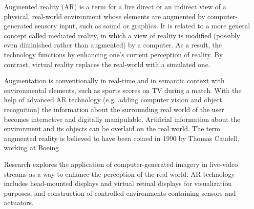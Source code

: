 Augmented reality (AR) \cite{wikiAR} is a term for a live direct or an indirect view of a physical, real-world environment whose elements are augmented by computer-generated sensory input, such as sound or graphics. It is related to a more general concept called mediated reality, in which a view of reality is modified (possibly even diminished rather than augmented) by a computer. As a result, the technology functions by enhancing one’s current perception of reality. By contrast, virtual reality replaces the real-world with a simulated one.

Augmentation is conventionally in real-time and in semantic context with environmental elements, such as sports scores on TV during a match. With the help of advanced AR technology (e.g. adding computer vision and object recognition) the information about the surrounding real world of the user becomes interactive and digitally manipulable. Artificial information about the environment and its objects can be overlaid on the real world. The term augmented reality is believed to have been coined in 1990 by Thomas Caudell, working at Boeing.

Research explores the application of computer-generated imagery in live-video streams as a way to enhance the perception of the real world. AR technology includes head-mounted displays and virtual retinal displays for visualization purposes, and construction of controlled environments containing sensors and actuators. 
\label{ http://en.wikipedia.org/wiki/Augmented_reality}
